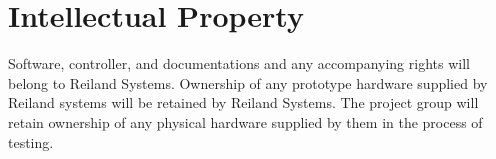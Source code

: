 \documentclass[draft]{article}
\begin{document}
\section{Intellectual Property}
Software, controller, and documentations and any accompanying rights will belong to Reiland Systems.  Ownership of any prototype hardware supplied by Reiland systems will be retained by Reiland Systems.  The project group will retain ownership of any physical hardware supplied by them in the process of testing.

\end{document}
